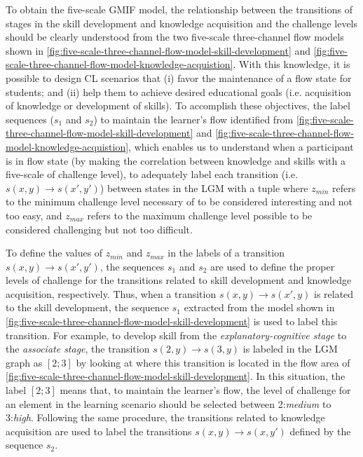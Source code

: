To obtain the five-scale GMIF model, the relationship between the transitions of stages in the skill development and knowledge acquisition and the challenge levels should be clearly understood from the two five-scale three-channel flow models shown in \autoref{fig:five-scale-three-channel-flow-model-skill-development} and \autoref{fig:five-scale-three-channel-flow-model-knowledge-acquistion}.
With this knowledge, it is possible to design CL scenarios that (i) favor the maintenance of a flow state for students; and (ii) help them to achieve desired educational goals (i.e. acquisition of knowledge or development of skills).
To accomplish these objectives, the label sequences ($s_{1}$ and $s_{2}$) to maintain the learner's flow identified from \autoref{fig:five-scale-three-channel-flow-model-skill-development} and \autoref{fig:five-scale-three-channel-flow-model-knowledge-acquistion}, which enables us to understand when a participant is in flow state (by making the correlation between knowledge and skills with a five-scale of challenge level), to adequately label each transition (i.e. $s(x,y) \to s(x',y')$) between states in the LGM with a tuple  where $z_{min}$ refers to the minimum challenge level necessary of to be considered interesting and not too easy, and $z_{max}$ refers to the maximum challenge level possible to be considered challenging but not too difficult.

To define the values of $z_{min}$ and $z_{max}$ in the labels  of a transition $s(x,y) \to s(x',y')$, the sequences $s_{1}$ and $s_{2}$ are used to define the proper levels of challenge for the transitions related to skill development and knowledge acquisition, respectively.
Thus, when a transition $s(x, y) \to s(x', y)$ is related to the skill development, the sequence $s_{1}$ extracted from the model shown in \autoref{fig:five-scale-three-channel-flow-model-skill-development} is used to label this transition.
For example, to develop skill from the \emph{explanatory-cognitive stage} to the \emph{associate stage}, the transition $s(2,y) \to s(3,y)$ is labeled in the LGM graph as $[2;3]$ by looking at where this transition is located in the flow area of \autoref{fig:five-scale-three-channel-flow-model-skill-development}.
In this situation, the label $[2;3]$ means that, to maintain the learner’s flow, the level of challenge for an element in the learning scenario should be selected between 2:\emph{medium} to 3:\emph{high}.
Following the same procedure, the transitions related to knowledge acquisition are used to label the transitions $s(x,y) \to s(x,y')$ defined by the sequence $s_{2}$.

